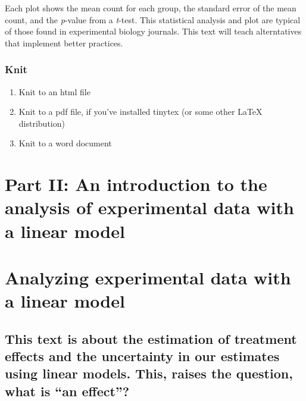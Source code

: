 \documentclass[]{book}
\providecommand{\tightlist}{%
  \setlength{\itemsep}{0pt}\setlength{\parskip}{0pt}}
\begin{document}
Each plot shows the mean count for each group, the standard error of the mean count, and the \emph{p}-value from a \emph{t}-test. This statistical analysis and plot are typical of those found in experimental biology journals. This text will teach alterntatives that implement better practices.

\hypertarget{knit}{%
\subsection{Knit}\label{knit}}

\begin{enumerate}
\def\labelenumi{\arabic{enumi}.}
\setcounter{enumi}{5}
\tightlist
\item
  Knit to an html file
\item
  Knit to a pdf file, if you've installed tinytex (or some other LaTeX distribution)
\item
  Knit to a word document
\end{enumerate}

\hypertarget{part-ii-an-introduction-to-the-analysis-of-experimental-data-with-a-linear-model}{%
\chapter*{Part II: An introduction to the analysis of experimental data with a linear model}\label{part-ii-an-introduction-to-the-analysis-of-experimental-data-with-a-linear-model}}

\hypertarget{analyzing-experimental-data-with-a-linear-model}{%
\chapter{Analyzing experimental data with a linear model}\label{analyzing-experimental-data-with-a-linear-model}}

\hypertarget{this-text-is-about-the-estimation-of-treatment-effects-and-the-uncertainty-in-our-estimates-using-linear-models.-this-raises-the-question-what-is-an-effect}{%
\section{This text is about the estimation of treatment effects and the uncertainty in our estimates using linear models. This, raises the question, what is ``an effect''?}\label{this-text-is-about-the-estimation-of-treatment-effects-and-the-uncertainty-in-our-estimates-using-linear-models.-this-raises-the-question-what-is-an-effect}}
\end{document}
